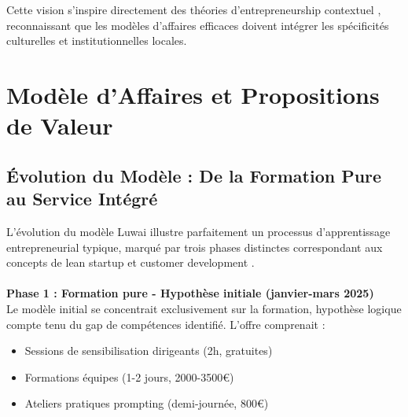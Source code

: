 Cette vision s'inspire directement des théories d'entrepreneurship contextuel \cite{welter2011contextualizing}, reconnaissant que les modèles d'affaires efficaces doivent intégrer les spécificités culturelles et institutionnelles locales.

\section{Modèle d'Affaires et Propositions de Valeur}

\subsection{Évolution du Modèle : De la Formation Pure au Service Intégré}

L'évolution du modèle Luwai illustre parfaitement un processus d'apprentissage entrepreneurial typique, marqué par trois phases distinctes correspondant aux concepts de lean startup et customer development \cite{blank2013startup,ries2011lean}.
\\\\
\textbf{Phase 1 : Formation pure - Hypothèse initiale (janvier-mars 2025)}\\
Le modèle initial se concentrait exclusivement sur la formation, hypothèse logique compte tenu du gap de compétences identifié. L'offre comprenait :
\begin{itemize}
    \item Sessions de sensibilisation dirigeants (2h, gratuites)
    \item Formations équipes (1-2 jours, 2000-3500€)
    \item Ateliers pratiques prompting (demi-journée, 800€)
\end{itemize}

